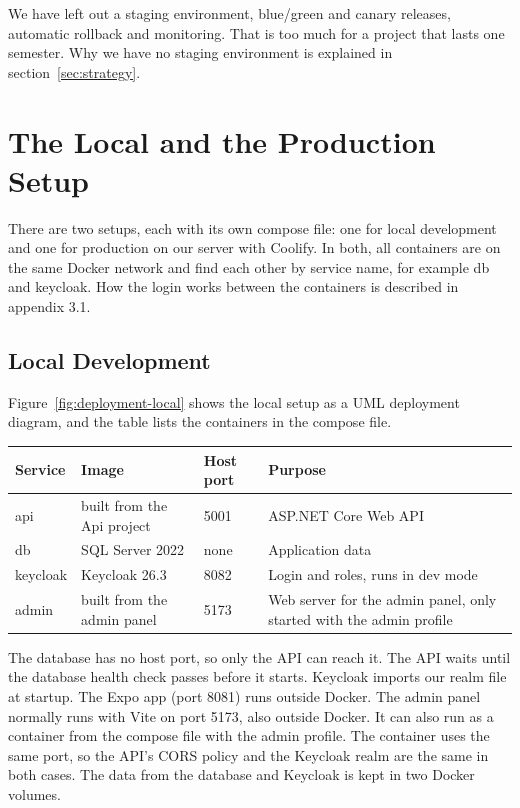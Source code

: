 \documentclass[a4paper,11pt]{article}
\begin{document}
We have left out a staging environment, blue/green and canary releases, automatic rollback and monitoring. That is too much for a project that lasts one semester. Why we have no staging environment is explained in section~\ref{sec:strategy}.

\section{The Local and the Production Setup}\label{sec:environments}
There are two setups, each with its own compose file: one for local development and one for production on our server with Coolify. In both, all containers are on the same Docker network and find each other by service name, for example db and keycloak. How the login works between the containers is described in appendix 3.1.

\subsection{Local Development}
Figure~\ref{fig:deployment-local} shows the local setup as a UML deployment diagram, and the table lists the containers in the compose file.


\begin{center}
\begin{tabular}{@{}l l l p{5.5cm}@{}}
\textbf{Service} & \textbf{Image} & \textbf{Host port} & \textbf{Purpose} \\
\hline
api & built from the Api project & 5001 & ASP.NET Core Web API \\
db & SQL Server 2022 & none & Application data \\
keycloak & Keycloak 26.3 & 8082 & Login and roles, runs in dev mode \\
admin & built from the admin panel & 5173 & Web server for the admin panel, only started with the admin profile \\
\end{tabular}
\end{center}

The database has no host port, so only the API can reach it. The API waits until the database health check passes before it starts. Keycloak imports our realm file at startup. The Expo app (port 8081) runs outside Docker. The admin panel normally runs with Vite on port 5173, also outside Docker. It can also run as a container from the compose file with the admin profile. The container uses the same port, so the API's CORS policy and the Keycloak realm are the same in both cases. The data from the database and Keycloak is kept in two Docker volumes.
\end{document}
